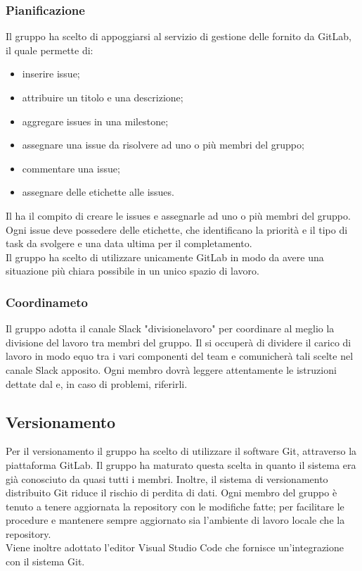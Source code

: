 \subsubsection{Pianificazione}
Il gruppo ha scelto di appoggiarsi al servizio di gestione delle  fornito da GitLab, il quale permette di:
\begin{itemize}
    \item inserire issue;
    \item attribuire un titolo e una descrizione;
    \item aggregare issues in una milestone;
    \item assegnare una issue da risolvere ad uno o più membri del gruppo;
    \item commentare una issue;
    \item assegnare delle etichette alle issues.
\end{itemize}
Il \roleProjectManager{} ha il compito di creare le issues e assegnarle ad uno o più membri del gruppo. 
Ogni issue deve possedere delle etichette, che identificano la priorità e il tipo di task da svolgere e una data ultima per il completamento.\\
Il gruppo ha scelto di utilizzare unicamente GitLab in modo da avere una situazione più chiara possibile in un unico spazio di lavoro.

\subsubsection{Coordinameto}
Il gruppo adotta il canale Slack "divisionelavoro" per coordinare al meglio la divisione del lavoro tra membri del gruppo. 
Il \roleProjectManagerP{} si occuperà di dividere il carico di lavoro in modo equo tra i vari componenti del team e comunicherà tali scelte nel canale Slack apposito. Ogni membro dovrà leggere attentamente le istruzioni dettate dal \roleProjectManager{} e, in caso di problemi, riferirli.

\subsection{Versionamento}
Per il versionamento il gruppo ha scelto di utilizzare il software Git, attraverso la piattaforma GitLab.
Il gruppo ha maturato questa scelta in quanto il sistema era già conosciuto da quasi tutti i membri. 
Inoltre, il sistema di versionamento distribuito Git riduce il rischio di perdita di dati. Ogni membro del gruppo è tenuto a tenere aggiornata la repository con le modifiche fatte; per facilitare le procedure e mantenere sempre aggiornato sia l'ambiente di lavoro locale che la repository. \\
Viene inoltre adottato l'editor Visual Studio Code che fornisce un'integrazione con il sistema Git.

